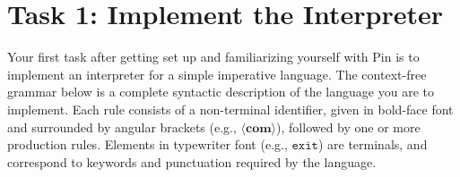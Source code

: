\documentclass[11pt]{article}
\begin{document}
\newpage

\section{Task 1: Implement the Interpreter}
\label{sect:task1}

Your first task after getting set up and familiarizing yourself with Pin is to implement an interpreter for a simple imperative language. The context-free grammar below is a complete syntactic description of the language you are to implement. Each rule consists of a non-terminal identifier, given in bold-face font and surrounded by angular brackets (e.g., $\langle\mathbf{com}\rangle$), followed by one or more production rules. Elements in typewriter font (e.g., $\mathtt{exit}$) are terminals, and correspond to keywords and punctuation required by the language.
\end{document}
